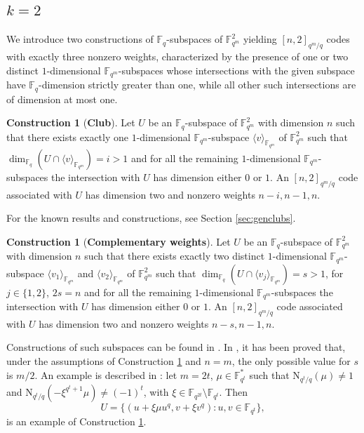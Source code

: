 \documentclass[11pt]{amsart}
\theoremstyle{definition}
\newtheorem{construction}[theorem]{Construction}
\newcommand{\F}{{\mathbb F}}
\newcommand{\fq}{{\mathbb F}_{q}}
\newcommand{\N}{\mathrm{N}}
\begin{document}
\subsection{$k=2$}

We introduce two constructions of $\fq$-subspaces of $\F_{q^m}^2$ yielding $[n,2]_{q^m/q}$ codes with exactly three nonzero weights, characterized by the presence of one or two distinct $1$-dimensional $\F_{q^m}$-subspaces whose intersections with the given subspace have $\fq$-dimension strictly greater than one, while all other such intersections are of dimension at most one.

\begin{construction}[\textbf{Club}]\label{exiclub}
Let $U$ be an $\fq$-subspace of $\F_{q^m}^2$ with dimension $n$ such that there exists exactly one $1$-dimensional $\F_{q^m}$-subspace $\langle v \rangle_{\F_{q^m}}$ of $\F_{q^m}^2$ such that $\dim_{\fq}(U\cap \langle v \rangle_{\F_{q^m}})=i>1$ and for all the remaining $1$-dimensional $\F_{q^m}$-subspaces the intersection with $U$ has dimension either $0$ or $1$.
An $[n,2]_{q^m/q}$ code associated with $U$ has dimension two and nonzero weights $n-i, n-1,n$.
\end{construction}

For the known results and constructions, see Section \ref{sec:genclubs}.

\begin{construction}[\textbf{Complementary weights}]\label{excompl}
Let $U$ be an $\fq$-subspace of $\F_{q^m}^2$ with dimension $n$ such that there exists exactly two distinct $1$-dimensional $\F_{q^m}$-subspace $\langle v_1 \rangle_{\F_{q^m}}$ and $\langle v_2 \rangle_{\F_{q^m}}$ of $\F_{q^m}^2$ such that $\dim_{\fq}(U\cap \langle v_j \rangle_{\F_{q^m}})=s>1$, for $j \in \{1,2\}$, $2s=n$ and for all the remaining $1$-dimensional $\F_{q^m}$-subspaces the intersection with $U$ has dimension either $0$ or $1$.
An $[n,2]_{q^m/q}$ code associated with $U$ has dimension two and nonzero weights $n-s, n-1,n$.
\end{construction}

Constructions of such subspaces can be found in \cite{napolitano2022linear}. 
In \cite[Theorem 4.4]{napolitano2022linear}, it has been proved that, under the assumptions of Construction \ref{excompl} and $n=m$, the only possible value for $s$ is $m/2$. 
An example is described in \cite[Corollary 4.9]{napolitano2022linear}:
let $m=2t$, $\mu \in \F_{q^t}^*$ such that $\N_{q^t/q}(\mu) \neq 1$ and $\N_{q^{t}/q}(-\xi^{q^t+1}\mu)\neq (-1)^t$, 
with $\xi \in \F_{q^{2t}}\setminus\F_{q^t}$.
Then
\[ U=\{ (u+\xi \mu u^{q},v+\xi v^{q}) \colon u,v \in \F_{q^t} \}, \]
is an example of Construction \ref{excompl}.
\end{document}
